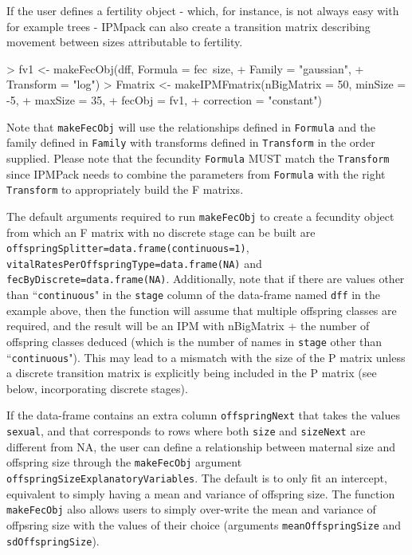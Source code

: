 \documentclass{article}
\begin{document}
If the user defines a fertility object - which, for instance, is not always easy with for example trees - IPMpack can also create a transition matrix describing movement between sizes attributable to fertility.
\begin{Schunk}
\begin{Sinput}
> fv1 <- makeFecObj(dff, Formula = fec~size, 	
+                   Family = "gaussian", 
+                   Transform = "log")
> Fmatrix <- makeIPMFmatrix(nBigMatrix = 50, minSize = -5,
+                             maxSize = 35, 
+                             fecObj = fv1, 
+                             correction = "constant")
\end{Sinput}
\end{Schunk}
Note that {\tt makeFecObj} will use the relationships defined in {\tt Formula} and the family defined in {\tt Family} with transforms defined in {\tt Transform} in the order supplied. Please note that the fecundity {\tt Formula} MUST match the {\tt Transform} since IPMPack needs to combine the parameters from  {\tt Formula}  with the right  {\tt Transform}  to appropriately build the F matrixs. 

The default arguments required to run {\tt makeFecObj} to create a fecundity
object from which an F matrix with no discrete stage can be built are {\tt
offspringSplitter=data.frame(continuous=1)}, {\tt 
vitalRatesPerOffspringType=data.frame(NA)} and {\tt fecByDiscrete=data.frame(NA)}.
Additionally, note that if there are values other than ``{\tt continuous}" in the {\tt stage} column of the data-frame named {\tt dff} in the example above, then the function will assume that multiple offspring classes are required, and the result will be an IPM with nBigMatrix + the number of offspring classes deduced (which is the number of names in {\tt stage} other than ``{\tt continuous}"). This may lead to a mismatch with the size of the P matrix unless a discrete transition matrix is explicitly being included in the P matrix (see below, incorporating discrete stages).

If the data-frame contains an extra column {\tt offspringNext} that takes the
values {\tt sexual}, and that corresponds to rows where both {\tt size} and {\tt sizeNext} are different from NA, the user can define a relationship between maternal size and offspring size through the {\tt makeFecObj} argument {\tt offspringSizeExplanatoryVariables}. The default is to only fit an intercept, equivalent to simply having a mean and variance of offspring size. The function {\tt makeFecObj} also allows users to simply over-write the mean and variance of offpsring size with the values of their choice (arguments {\tt meanOffspringSize} and {\tt sdOffspringSize}).
\end{document}
